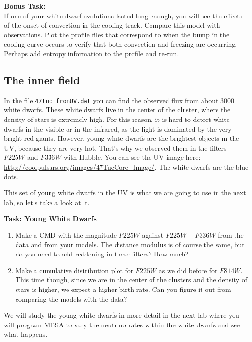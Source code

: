 \documentclass{article}
\begin{document}
\textbf{Bonus Task:}\\
If one of your white dwarf evolutions lasted long enough, you will see the effects of the onset of convection in the cooling track.  Compare this model with observations.   Plot the profile files that correspond to when the bump in the cooling curve occurs to verify that both convection and freezing are occurring.   Perhaps add entropy information to the profile and re-run. 


\subsection{The inner field}

In the file \texttt{47tuc\_fromUV.dat} you can find the observed flux from about 3000 white dwarfs. These white dwarfs live in the center of the cluster, where the density of stars is extremely high. For this reason, it is hard to detect white dwarfs in the visible or in the infrared, as the light is dominated by the very bright red giants. However, young white dwarfs are the brightest objects in the UV, because they are very hot. That's why we observed them in the filters $F225W$ and $F336W$ with Hubble. You can see the UV image here: \url{http://coolpulsars.org/images/47TucCore_Image/}.  The white dwarfs are the blue dots.

This set of young white dwarfs in the UV is what we are going to use in the next lab, so let's take a look at it.

\textbf{Task: Young White Dwarfs}\vspace{-1em}
\begin{enumerate}
 \setlength\itemsep{0em}
\item Make a CMD with the magnitude $F225W$ against $F225W-F336W$ from the data and from your models. The distance modulus is of course the same, but do you need to add reddening in these filters? How much?
\item Make a cumulative distribution plot for $F225W$ as we did before for $F814W$. This time though, since we are in the center of the clusters and the density of stars is higher, we expect a higher birth rate. Can you figure it out from comparing the models with the data?
\end{enumerate}

We will study the young white dwarfs in more detail in the next lab where you will program MESA to vary the neutrino rates within the white dwarfs and see what happens.
\end{document}
